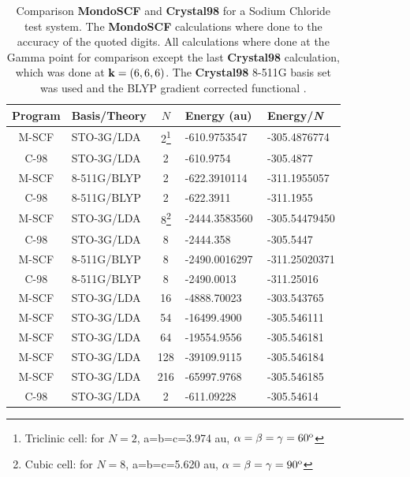 \documentclass[prb,aps,nobibnotes,twocolumn,doublespace,twocolumngrid,superbib]{revtex4}
\begin{document}
\begin{table}
\caption{Comparison \textbf{MondoSCF} and \textbf{Crystal98} for a 
Sodium Chloride test system. The \textbf{MondoSCF} calculations where done to
the accuracy of the quoted digits. All calculations where done at the Gamma point
for comparison except the last \textbf{Crystal98} calculation, which was done at ${\bf k}=(6,6,6)$.
The \textbf{Crystal98} 8-511G  basis set was used \cite{C98Basis} and the BLYP gradient corrected 
functional \cite{Becke92}.}
\label{table:ComToCrystal98_1}
 
\begin{tabular}{clcll}
\hline 
Program&
Basis/Theory&
\( N \)&
Energy  (au)&
Energy/{\it N}\\
\hline
\hline 
M-SCF &
STO-3G/LDA&
2\footnote[1]{Triclinic cell: for $N=2$, a=b=c=3.974 au, $\alpha=\beta=\gamma=60^{{\rm o}}$}&
-610.9753547&
-305.4876774\\
C-98&
STO-3G/LDA&
2\footnotemark[1]&
-610.9754&
-305.4877\\
M-SCF&
8-511G/BLYP&
2\footnotemark[1]&
-622.3910114&
-311.1955057\\
C-98&
8-511G/BLYP&
2\footnotemark[1]&
-622.3911&
-311.1955\\
\hline 
M-SCF&
STO-3G/LDA&
8\footnote[2]{Cubic cell: for $N=8$, a=b=c=5.620 au, $\alpha=\beta=\gamma=90^{{\rm o}}$}&
-2444.3583560&
-305.54479450\\
C-98&
STO-3G/LDA&
8\footnotemark[2]&
-2444.358&
-305.5447\\
M-SCF&
8-511G/BLYP&
8\footnotemark[2]&
-2490.0016297&
-311.25020371\\
C-98&
8-511G/BLYP&
8\footnotemark[2]&
-2490.0013&
-311.25016 \\
\hline 
M-SCF&
STO-3G/LDA&
16\footnotemark[1]&
-4888.70023&
-303.543765\\
M-SCF&
STO-3G/LDA&
54\footnotemark[1]&
-16499.4900&
-305.546111\\
M-SCF&
STO-3G/LDA&
64\footnotemark[2]&
-19554.9556&
-305.546181\\
M-SCF&
STO-3G/LDA&
128\footnotemark[1]&
-39109.9115&
-305.546184\\
M-SCF&
STO-3G/LDA&
216\footnotemark[2] &
-65997.9768&
-305.546185\\
\hline
\,\,C-98\,\,&
STO-3G/LDA\,\,&
\,\,2\footnotemark[1]\,\,&
-611.09228\,\,\,\,\,\,\,\,\,\,\,&
-305.54614\\
\hline
\end{tabular}
\end{table}
%
%
%
\end{document}
